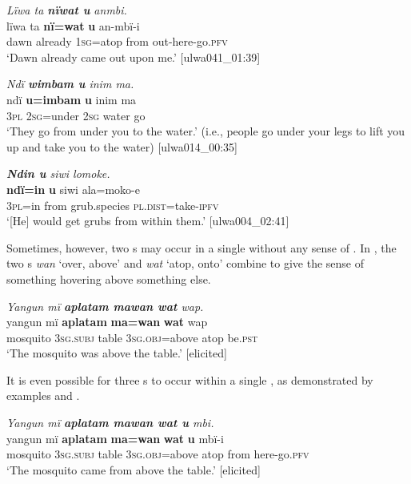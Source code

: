 \ea%
    \label{ex:phrase:98}
          \textit{Lïwa ta \textbf{nïwat u} anmbi.}\\
\gll    lïwa  ta    \textbf{nï=wat}  \textbf{u}    an-mbï-i\\
    dawn  already  1\textsc{sg=}atop  from  out-here-go.\textsc{pfv}\\
\glt `Dawn already came out upon me.’ [ulwa041\_01:39]
\z

\ea%
    \label{ex:phrase:99}
          \textit{Ndï \textbf{wimbam u} inim ma.}\\
\gll    ndï  \textbf{u=imbam}   \textbf{u}    inim  ma\\
    3\textsc{pl}  2\textsc{sg}=under  \textsc{2sg}  water  go\\
\glt `They go from under you to the water.’ (i.e., people go under your legs to lift you up   and take you to the water) [ulwa014\_00:35]
\z

\ea%
    \label{ex:phrase:100}
          \textit{\textbf{Ndin u} siwi lomoke.}\\
\gll    \textbf{ndï=in}  \textbf{u}    siwi    ala=moko-e\\
    3\textsc{pl=}in  from  grub.species  \textsc{pl.dist}=take-\textsc{ipfv}\\
\glt `[He] would get grubs from within them.’ [ulwa004\_02:41]
\z

Sometimes, however, two s may occur in a single  without any sense of . In , the two s \textit{wan} ‘over, above’ and \textit{wat} ‘atop, onto’ combine to give the sense of something hovering above something else.

\ea%
    \label{ex:phrase:101}
          \textit{Yangun mï \textbf{aplatam mawan wat} wap.}\\
\gll    yangun    mï      \textbf{aplatam}  \textbf{ma=wan}      \textbf{wat}  wap\\
    mosquito  3\textsc{sg.subj}  table    3\textsc{sg.obj}=above  atop  be.\textsc{pst}\\
\glt `The mosquito was above the table.’ [elicited]
\z

It is even possible for three s to occur within a single , as demonstrated by examples  and .

\ea%
    \label{ex:phrase:102}
          \textit{Yangun mï \textbf{aplatam mawan wat u} mbi.}\\
\gll    yangun    mï      \textbf{aplatam}  \textbf{ma=wan}      \textbf{wat}  \textbf{u} mbï-i\\
    mosquito  3\textsc{sg.subj}  table    3\textsc{sg.obj}=above  atop  from    here{}-go.\textsc{pfv}\\
\glt `The mosquito came from above the table.’ [elicited]
\z

